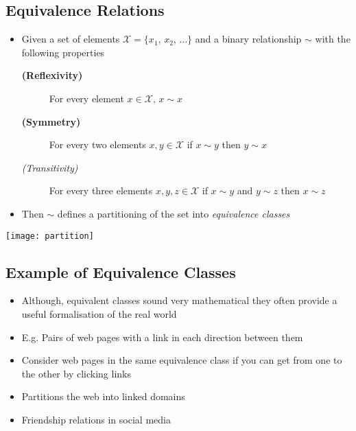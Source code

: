 \begin{slide}
\section[-2]{Equivalence Relations}
\begin{PauseHighLight}
  \begin{itemize}
  \item Given a set of elements $\mathcal{X}=\{x_1,\, x_2,\, \ldots \}$
    and a binary relationship $\sim$ with the following properties\pause
    \begin{description}
    \item[\textbf{(Reflexivity)}] For every element $x\in\mathcal{X}$,
      $x\sim x$\pause
    \item[\textbf{(Symmetry)}] For every two elements $x, y \in
      \mathcal{X}$ if $x \sim y$ then $y \sim x$\pause
    \item[\textit{(Transitivity)}] For every three elements $x, y, z \in
      \mathcal{X}$ if $x \sim y$ and $y\sim z$ then $x\sim z$\pause
    \end{description}
  \item Then $\sim$ defines a partitioning of the set into
    \emph{equivalence classes}
  \end{itemize}
  \begin{center}
    \texttt{[image: partition]}\pause
  \end{center}
\end{PauseHighLight}

\end{slide}


\begin{slide}
\section{Example of Equivalence Classes}

\begin{PauseHighLight}
  \begin{itemize}
  \item Although, equivalent classes sound very mathematical they
    often provide a useful formalisation of the real world\pause
  \item E.g. Pairs of web pages with a link in each direction between them\pause
  \item Consider web pages in the same equivalence class if you can
    get from one to the other by clicking links\pause
  \item Partitions the web into linked domains\pause
  \item Friendship relations in social media\pause
  \end{itemize}
\end{PauseHighLight}

\end{slide}

